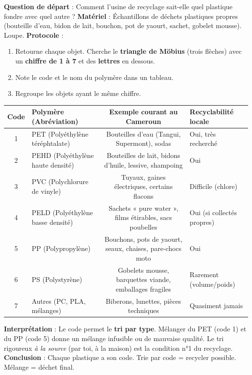 \documentclass[11pt]{article}
\begin{document}
\begin{experience}
\textbf{Question de départ} : Comment l'usine de recyclage sait-elle quel plastique fondre avec quel autre ?
\textbf{Matériel} : Échantillons de déchets plastiques propres (bouteille d'eau, bidon de lait, bouchon, pot de yaourt, sachet, gobelet mousse). Loupe.
\textbf{Protocole} :
\begin{enumerate}
    \item Retourne chaque objet. Cherche le \textbf{triangle de Möbius} (trois flèches) avec un \textbf{chiffre de 1 à 7} et des \textbf{lettres} en dessous.
    \item Note le code et le nom du polymère dans un tableau.
    \item Regroupe les objets ayant le même chiffre.
\end{enumerate}
\begin{center}
\begin{tabularx}{\linewidth}{|c|X|c|X|}\hline
\textbf{Code} & \textbf{Polymère (Abréviation)} & \textbf{Exemple courant au Cameroun} & \textbf{Recyclabilité locale} \\ \hline
1 & PET (Polyéthylène téréphtalate) & Bouteilles d'eau (Tangui, Supermont), sodas & \cellcolor{popgreenL} Oui, très recherché \\ \hline
2 & PEHD (Polyéthylène haute densité) & Bouteilles de lait, bidons d'huile, lessive, shampoing & \cellcolor{popgreenL} Oui \\ \hline
3 & PVC (Polychlorure de vinyle) & Tuyaux, gaines électriques, certains flacons & \cellcolor{poporangeL} Difficile (chlore) \\ \hline
4 & PELD (Polyéthylène basse densité) & Sachets « pure water », films étirables, sacs poubelles & \cellcolor{poporangeL} Oui (si collectés propres) \\ \hline
5 & PP (Polypropylène) & Bouchons, pots de yaourt, seaux, chaises, pare-chocs moto & \cellcolor{popgreenL} Oui \\ \hline
6 & PS (Polystyrène) & Gobelets mousse, barquettes viande, emballages fragiles & \cellcolor{popredL} Rarement (volume/poids) \\ \hline
7 & Autres (PC, PLA, mélanges) & Biberons, lunettes, pièces techniques & \cellcolor{popredL} Quasiment jamais \\ \hline
\end{tabularx}
\end{center}
\textbf{Interprétation} : Le code permet le \textbf{tri par type}. Mélanger du PET (code 1) et du PP (code 5) donne un mélange infusible ou de mauvaise qualité. Le tri rigoureux \emph{à la source} (par toi, à la maison) est la condition n°1 du recyclage.
\textbf{Conclusion} : Chaque plastique a son code. Trie par code = recycler possible. Mélange = déchet final.
\end{experience}
\end{document}
